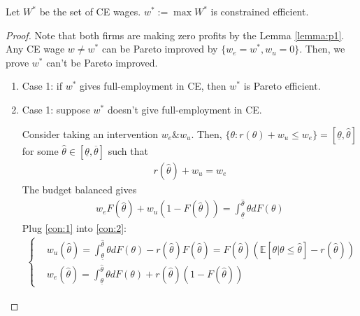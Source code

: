 \documentclass[11pt]{elegantbook_2}
\begin{document}
\begin{proposition}[$w^*:=\max W^*$ is constrained efficient]
    Let $W^*$ be the set of CE wages. $w^*:=\max W^*$ is constrained efficient.
\end{proposition}
\begin{proof}
    Note that both firms are making zero profits by the Lemma \ref{lemma:p1}. Any CE wage $w\neq w^*$ can be Pareto improved by $\{w_e=w^*,w_u=0\}$. Then, we prove $w^*$ can't be Pareto improved.
    \begin{enumerate}
        \item Case 1: if $w^*$ gives full-employment in CE, then $w^*$ is Pareto efficient.
        \item Case 1: suppose $w^*$ doesn't give full-employment in CE.
        
        Consider taking an intervention $w_e\&w_u$. Then, $\{\theta:r(\theta)+w_u\leq w_e\}=[\underline{\theta},\hat{\theta}]$ for some $\hat{\theta}\in[\underline{\theta},\overline{\theta}]$ such that
        \begin{equation}
            \begin{aligned}
                r(\hat{\theta})+w_u=w_e
            \end{aligned}
            \label{con:1}
        \end{equation}
        The budget balanced gives
        \begin{equation}
            \begin{aligned}
                w_e F(\hat{\theta})+w_u (1-F(\hat{\theta}))=\int_{\underline{\theta}}^{\hat{\theta}}\theta d F(\theta)
            \end{aligned}
            \label{con:2}
        \end{equation}
        Plug \eqref{con:1} into \eqref{con:2}:
        \begin{equation}
            \begin{aligned}
                \left\{\begin{matrix}
                    &w_u(\hat{\theta})=\int_{\underline{\theta}}^{\hat{\theta}}\theta d F(\theta)-r(\hat{\theta})F(\hat{\theta})=F(\hat{\theta})\left(\mathbb{E}[\theta|\theta\leq\hat{\theta}]-r(\hat{\theta})\right)\\
                    &w_e(\hat{\theta})=\int_{\underline{\theta}}^{\hat{\theta}}\theta d F(\theta)+r(\hat{\theta})(1-F(\hat{\theta}))
                \end{matrix}\right.
            \end{aligned}

\end{equation}
\end{enumerate}
\end{proof}
\end{document}

